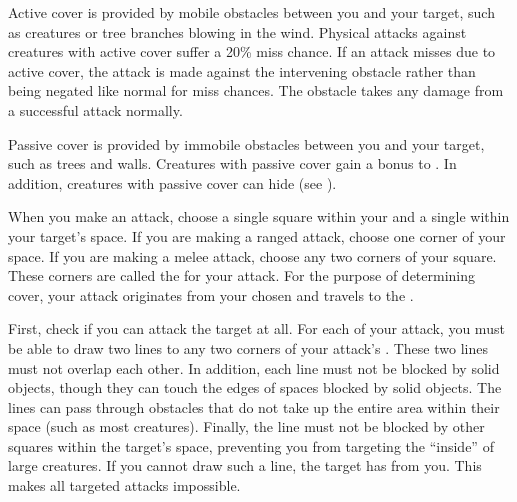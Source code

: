             \label{Active Cover} Active cover is provided by mobile obstacles between you and your target, such as creatures or tree branches blowing in the wind.
            Physical attacks against creatures with active cover suffer a 20\% miss chance.
            If an attack misses due to active cover, the attack is made against the intervening obstacle rather than being negated like normal for miss chances.
            The obstacle takes any damage from a successful attack normally.

            \label{Passive Cover} Passive cover is provided by immobile obstacles between you and your target, such as trees and walls.
            Creatures with passive cover gain a  bonus to .
            In addition, creatures with passive cover can hide (see ).


            When you make an attack, choose a single square within your  and a single  within your target's space.
            If you are making a ranged attack, choose one corner of your space.
            If you are making a melee attack, choose any two corners of your square.
            These corners are called the  for your attack.
            For the purpose of determining cover, your attack originates from your chosen  and travels to the .

            First, check if you can attack the target at all.
            For each  of your attack, you must be able to draw two lines to any two corners of your attack's .
            These two lines must not overlap each other.
            In addition, each line must not be blocked by solid objects, though they can touch the edges of spaces blocked by solid objects.
            The lines can pass through obstacles that do not take up the entire area within their space (such as most creatures).
            Finally, the line must not be blocked by other squares within the target's space, preventing you from targeting the ``inside'' of large creatures.
            If you cannot draw such a line, the target has  from you.
            This makes all targeted attacks impossible.

